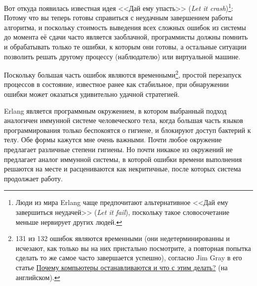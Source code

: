 Вот откуда появилась известная идея <<Дай ему упасть>> (\emph{Let it crash})\footnote{Люди из мира Erlang чаще предпочитают альтернативное <<Дай ему завершиться неудачей>> (\emph{Let it fail}), поскольку такое словосочетание меньше нервирует других людей.}: Потому что вы теперь готовы справиться с неудачным завершением работы алгоритма, и поскольку стоимость выведения всех сложных ошибок из системы до момента её сдачи часто является заоблачной, программисты должны помнить и обрабатывать только те ошибки, к которым они готовы, а остальные ситуации позволить решать другому процессу (наблюдателю) или виртуальной машине.

Поскольку большая часть ошибок являются временными\footnote{131 из 132 ошибок являются временными (они недетерминированны и исчезают, как только вы на них пристально посмотрите, а повторная попытка сделать то же самое часто завершается успешно), согласно Jim Gray в его статье \href{http://www.hpl.hp.com/techreports/tandem/TR-85.7.html}{Почему компьютеры останавливаются и что с этим делать?} (на английском).}, простой перезапуск процессов в состояние, известное ранее как стабильное, при обнаружении ошибки может оказаться удивительно удачной стратегией.

Erlang является программным окружением, в котором выбранный подход аналогичен иммун\-ной системе человеческого тела, когда большая часть языков программирования только беспоко\-ятся о гигиене, и блокируют доступ бактерий к телу. Обе формы кажутся мне очень важными. Почти любое окружение предлагает различные степени гигиены. Но почти никакое из окружений не предлагает аналог иммунной системы, в которой ошибки времени выполнения решаются на месте и расцениваются как некритичные, после которых система продолжает работу.

